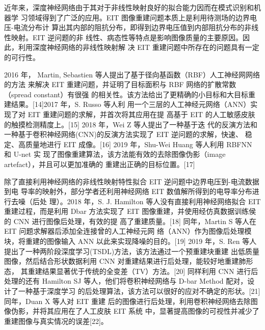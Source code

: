 
近年来，深度神经网络由于其对于非线性映射良好的拟合能力因而在模式识别和机器学
习领域得到了广泛的应用。EIT 图像重建问题本质上是利用待测场的边界电压-电流分布计
算出其内部的阻抗分布，即得到边界电压值到内部阻抗分布的非线性映射。EIT 逆问题的非
线性、病态性等特点是影响图像质量的主要原因。因此，利用深度神经网络的非线性映射解
决 EIT 重建问题中所存在的问题具有一定的可行性。

2016 年， Martin, Sebastien 等人提出了基于径向基函数（RBF）人工神经网网络的方法
来解决 EIT 重建问题，并证明了目标面积与 RBF 网络的扩散常数（spread constant）有很强
的相关性。该方法给出了更精确的小目标和大目标重建结果。[14]2017 年，S. Russo 等人利
用一个三层的人工神经元网络（ANN）实现了对 EIT 重建问题的求解，并首次将其应用在提
高基于 EIT 的人工敏感皮肤的触摸检测精度上。[15] 2018 年，Wei Z 等人提出了一种基于迭
代的反演方法和一种基于卷积神经网络(CNN)的反演方法实现了 EIT 逆问题的求解，快速、
稳定、高质量地进行 EIT 成像。[16] 2019 年，Shu-Wei Huang 等人利用 RBFNN 和 U-net 实
现了图像重建算法，该方法能有效的去除图像伪影（image artefact），并且可以更加准确的
重建出正确的目标位置。[17]

除了直接利用神经网络的非线性映射特性拟合 EIT 逆问题中边界电压到-电流数据到电
导率的映射外，部分学者还利用神经网络 EIT 数值解所得到的电导率分布进行去噪（后处
理）。2018 年，S. J. Hamilton 等人没有直接利用神经网络拟合 EIT 重建过程，而是利用 Dbar 方法实现了 EIT 图像重建，并使用经仿真数据训练侯的 CNN 进行图像后处理，有效的提
高了重建质量。[18] 同年，Martin S 等人在 EIT 问题求解器后添加全连接曾的人工神经元网
络（ANN）作为图像后处理模块，将重建的图像输入 ANN 以此来实现降噪的目的。[19]
2019 年，S. Ren 等人提出了一种两阶段深度学习(TSDL)方法，该方法通过一个预重建块重建
出低质量图像，然后结合形状数据利用 CNN 对重建结果进行后处理，能较好地重建肺形态，
其重建结果显著优于传统的全变差（TV）方法。[20] 同样利用 CNN 进行后处理的还有
Hamilton SJ 等人，他们将卷积神经网络与 D-bar Method 配对，设计了一种基于深度学习
的后处理算法，该方法可以很好的应对不确定的形状。[21] 同年，Duan X 等人对 EIT 重建
后的图像进行后处理，利用卷积神经网络去除图像伪影，并将其应用在了人工皮肤 EIT 系统
中，显著提高图像的可视性并减少了重建图像与真实情况的误差[22]。

